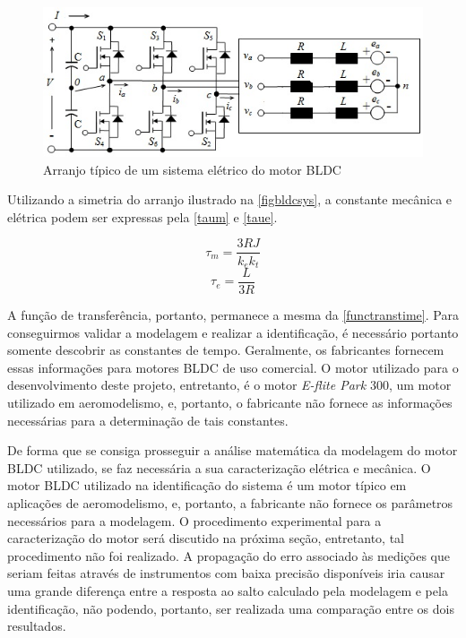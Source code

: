 \documentclass[
	12pt,				%
	openright,			%
	oneside,			%
	a4paper,			%
	english,			%
	french,				%
	spanish,			%
	brazil,				%
	]{abntex2}
\begin{document}
\begin{figure}[htb]
	\caption{\label{figbldcsys}Arranjo típico de um sistema elétrico do motor BLDC}
	\begin{center}
	  \includegraphics{figuras/figbldcsys.jpg}
	\end{center}
\end{figure}

Utilizando a simetria do arranjo ilustrado na \autoref{figbldcsys}, a constante mecânica e elétrica podem ser expressas pela \autoref{taum} e \autoref{taue}.

\begin{equation}
\label{taum}
  \tau_m = \frac{3RJ}{k_ek_t}
\end{equation}
\begin{equation}
\label{taue}
  \tau_e = \frac{L}{3R}
\end{equation}

A função de transferência, portanto, permanece a mesma da \autoref{functranstime}. Para conseguirmos validar a modelagem e realizar a identificação, é necessário portanto somente descobrir as constantes de tempo. Geralmente, os fabricantes fornecem essas informações para motores BLDC de uso comercial. O motor utilizado para o desenvolvimento deste projeto, entretanto, é o motor \textit{E-flite Park} 300, um motor utilizado em aeromodelismo, e, portanto, o fabricante não fornece as informações necessárias para a determinação de tais constantes.

De forma que se consiga prosseguir a análise matemática da modelagem do motor BLDC utilizado, se faz necessária a sua caracterização elétrica e mecânica. O motor BLDC utilizado na identificação do sistema é um motor típico em aplicações de aeromodelismo, e, portanto, a fabricante não fornece os parâmetros necessários para a modelagem. O procedimento experimental para a caracterização do motor será discutido na próxima seção, entretanto, tal procedimento não foi realizado. A propagação do erro associado às medições que seriam feitas através de instrumentos com baixa precisão disponíveis iria causar uma grande diferença entre a resposta ao salto calculado pela modelagem e pela identificação, não podendo, portanto, ser realizada uma comparação entre os dois resultados.
\end{document}
